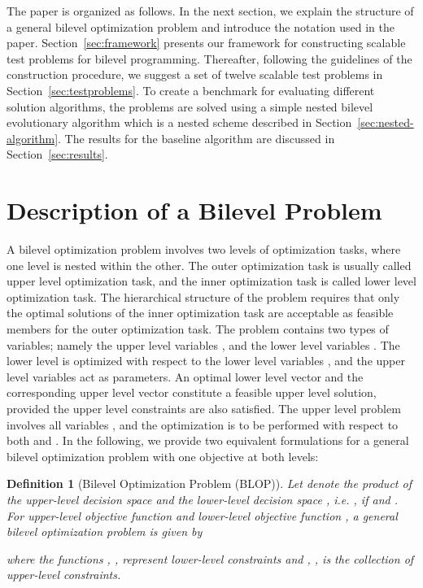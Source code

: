 \documentclass[twoside]{article}
\newtheorem{definition}[theorem]{Definition}
\begin{document}
The paper is organized as follows. In the next section, we explain the structure of a general bilevel optimization problem and introduce the notation used in the paper. Section~\ref{sec:framework} presents our framework for constructing scalable test problems for bilevel programming. Thereafter, following the guidelines of the construction procedure, we suggest a set of twelve scalable test problems in Section~\ref{sec:testproblems}. To create a benchmark for evaluating different solution algorithms, the problems are solved using a simple nested bilevel evolutionary algorithm which is a nested scheme described in Section~\ref{sec:nested-algorithm}. The results for the baseline algorithm are discussed in Section~\ref{sec:results}.

\section{Description of a Bilevel Problem}
A bilevel optimization problem involves two levels of optimization tasks, where one level is nested within the other. The outer optimization task is usually called upper level optimization task, and the inner optimization task is called lower level optimization task. The hierarchical structure of the problem requires that only the optimal solutions of the inner optimization task are acceptable as feasible members for the outer optimization task. The problem contains two types of variables; namely the upper level variables , and the lower level variables . The lower level is optimized with respect to the lower level variables , and the upper level variables  act as parameters. An optimal lower level vector and the corresponding upper level vector  constitute a feasible upper level solution, provided the upper level constraints are also satisfied. The upper level problem involves  all variables , and the optimization is to be performed with respect to both  and . In the following, we provide two equivalent formulations for a general bilevel optimization problem with one objective at both levels:

\vskip 0.1cm
\begin{definition}[Bilevel Optimization Problem (BLOP)]
Let  denote the product of the upper-level decision space   and the lower-level decision space , i.e. , if  and . For upper-level objective function  and lower-level objective function , a general bilevel optimization problem is given by

where the functions , , represent lower-level constraints and , , is the collection of upper-level constraints.
\end{definition}
\vskip 0.2cm
\end{document}
